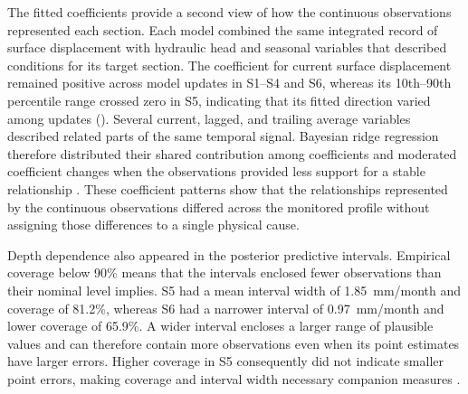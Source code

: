 The fitted coefficients provide a second view of how the continuous observations represented each section. Each model combined the same integrated record of surface displacement with hydraulic head and seasonal variables that described conditions for its target section. The coefficient for current surface displacement remained positive across model updates in S1--S4 and S6, whereas its 10th--90th percentile range crossed zero in S5, indicating that its fitted direction varied among updates (). Several current, lagged, and trailing average variables described related parts of the same temporal signal. Bayesian ridge regression therefore distributed their shared contribution among coefficients and moderated coefficient changes when the observations provided less support for a stable relationship \citep{dormann_collinearity_2013,hastie_elements_2009,mackay_bayesian_1992}. These coefficient patterns show that the relationships represented by the continuous observations differed across the monitored profile without assigning those differences to a single physical cause.

Depth dependence also appeared in the posterior predictive intervals. Empirical coverage below 90\% means that the intervals enclosed fewer observations than their nominal level implies. S5 had a mean interval width of 1.85~mm/month and coverage of 81.2\%, whereas S6 had a narrower interval of 0.97~mm/month and lower coverage of 65.9\%. A wider interval encloses a larger range of plausible values and can therefore contain more observations even when its point estimates have larger errors. Higher coverage in S5 consequently did not indicate smaller point errors, making coverage and interval width necessary companion measures \citep{gneiting_probabilistic_2007, gelman_bayesian_2013}.

